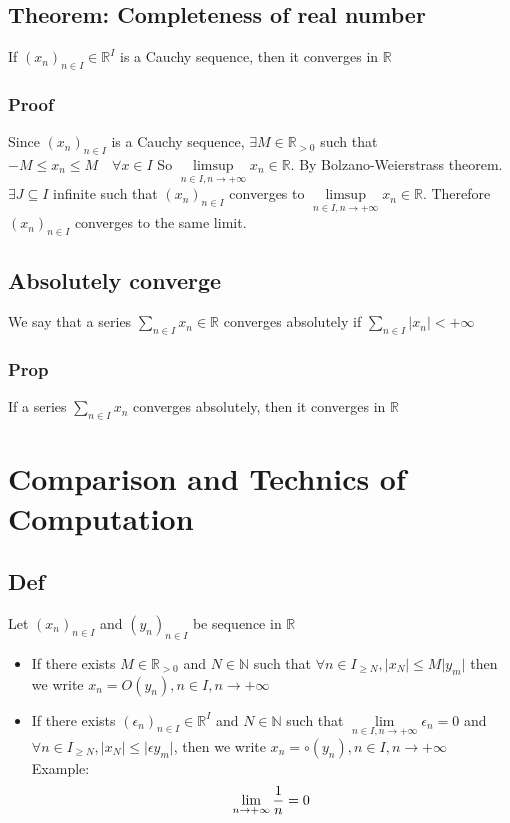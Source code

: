 \documentclass{book}
\begin{document}
\section{Theorem: Completeness of real number}
If $(x_n)_{n\in I}\in\mathbb{R} ^I$ is a Cauchy sequence,
then it converges in $\mathbb{R}$
\subsection{Proof}
Since $(x_n)_{n\in I}$ is a Cauchy sequence, $\exists M\in \mathbb{R} _{>0}$ such that $-M\leq x_n\leq M\quad \forall x\in I$ So $\limsup\limits_{n\in I,n\rightarrow+\infty}x_n\in \mathbb{R} $. By Bolzano-Weierstrass theorem. $\exists J\subseteq I$ infinite such that $(x_n)_{n\in I}$ converges to $\limsup\limits_{n\in I,n\rightarrow+\infty}x_n\in\mathbb{R} $. Therefore $(x_n)_{n\in I}$ converges to the same limit.
\section{Absolutely converge}
We say that a series $\sum\limits_{n\in I}x_n\in \mathbb{R} $ converges absolutely if $\sum\limits_{n\in I}\lvert x_n\rvert<+\infty$
\subsection{Prop}
If a series $\sum\limits_{n\in I}x_n$ converges absolutely, then it converges in $\mathbb{R}$
\chapter{Comparison and Technics of Computation}
\section{Def}
Let $(x_n)_{n\in I}$ and $(y_n)_{n\in I}$ be sequence in $\mathbb{R} $
\begin{itemize}
    \item If there exists $M\in\mathbb{R} _{>0}$ and $N\in \mathbb{N} $ such that $\forall n\in I_{\geq N},\lvert x_N\rvert\leq M\lvert y_m\rvert$ then we write $x_n=O(y_n),n\in I,n\rightarrow+\infty$
    \item If there exists $(\epsilon_n)_{n\in I}\in \mathbb{R} ^I$ and $N\in\mathbb{N} $ such that $\lim\limits_{n\in I,n\rightarrow+\infty}\epsilon_n=0$ and $\forall n\in I_{\geq N},\lvert x_N\rvert\leq \lvert \epsilon y_m\rvert$, then we write $x_n=\circ(y_n),n\in I,n\rightarrow +\infty$ \\Example:
        $$\lim\limits_{n\rightarrow+\infty}{1\over n}=0$$
\end{itemize}
\end{document}
